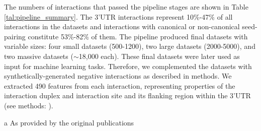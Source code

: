 The numbers of interactions that passed the pipeline stages are shown in Table \ref{tal:pipeline_summary}. The 3'UTR interactions represent 10\%-47\% of all interactions in the datasets and interactions with canonical or non-canonical seed-pairing constitute 53\%-82\% of them. The pipeline produced final datasets with variable sizes: four small datasets (500-1200), two large datasets (2000-5000), and two massive datasets ($\sim$18,000 each). These final datasets were later used as input for machine learning tasks. Therefore, we complemented the datasets with synthetically-generated negative interactions as described in methods. We extracted 490 features from each interaction, representing properties of the interaction duplex and interaction site and its flanking region within the 3'UTR (see methods: ).


\begin{table}[h!]
\caption{Summary of the data processing pipeline}
      \label{tal:pipeline_summary}
                 \begin{threeparttable}
\begin{tablenotes}
            \item[a] As provided by the original publications
        \end{tablenotes}
     \end{threeparttable}
\end{table}


